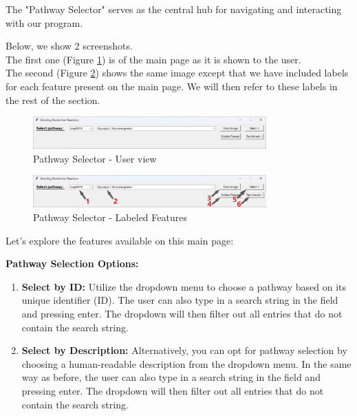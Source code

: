 The "Pathway Selector" serves as the central hub for navigating and interacting with our program.

Below, we show 2 screenshots. \\
The first one (Figure \ref{fig:pathway_selector}) is of the main page as it is shown to the user. \\
The second (Figure \ref{fig:pathway_selector_labeled_features}) shows the same image except that we have included labels for each feature present on the main page. We will then refer to these labels in the rest of the section.

\begin{figure}[H]
    \centering
    \includegraphics[width=0.8\textwidth]{Design of the User Interface/selector.png}
    \caption{Pathway Selector - User view}
    \label{fig:pathway_selector}
\end{figure}

\begin{figure}[H]
    \centering
    \includegraphics[width=0.8\textwidth]{Design of the User Interface/selector labeled.png}
    \caption{Pathway Selector - Labeled Features}
    \label{fig:pathway_selector_labeled_features}
\end{figure}
Let's explore the features available on this main page:

\textbf{Pathway Selection Options:}

\begin{enumerate}
    \item \textbf{Select by ID:} Utilize the dropdown menu to choose a pathway based on its unique identifier (ID). The user can also type in a search string in the field and pressing enter. The dropdown will then filter out all entries that do not contain the search string.
    \item \textbf{Select by Description:} Alternatively, you can opt for pathway selection by choosing a human-readable description from the dropdown menu. 
    In the same way as before, the user can also type in a search string in the field and pressing enter. The dropdown will then filter out all entries that do not contain the search string.
\end{enumerate}


